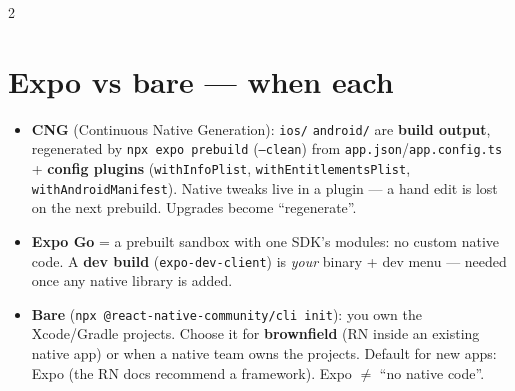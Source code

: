 \documentclass[8pt]{extarticle}
\begin{document}
\begin{multicols}{2}
\raggedright

\section{Expo vs bare — when each}
\begin{itemize}
  \item \textbf{CNG} (Continuous Native Generation): \texttt{ios/} \texttt{android/} are
        \textbf{build output}, regenerated by \texttt{npx expo prebuild} (\texttt{--clean})
        from \texttt{app.json}/\texttt{app.config.ts} + \textbf{config plugins}
        (\texttt{withInfoPlist}, \texttt{withEntitlementsPlist},
        \texttt{withAndroidManifest}). Native tweaks live in a plugin — a hand edit is
        lost on the next prebuild. Upgrades become ``regenerate''.
  \item \textbf{Expo Go} = a prebuilt sandbox with one SDK's modules: no custom native
        code. A \textbf{dev build} (\texttt{expo-dev-client}) is \emph{your} binary + dev
        menu — needed once any native library is added.
  \item \textbf{Bare} (\texttt{npx @react-native-community/cli init}): you own the
        Xcode/Gradle projects. Choose it for \textbf{brownfield} (RN inside an existing
        native app) or when a native team owns the projects. Default for new apps: Expo
        (the RN docs recommend a framework). Expo $\ne$ ``no native code''.
\end{itemize}


\end{multicols}
\end{document}

